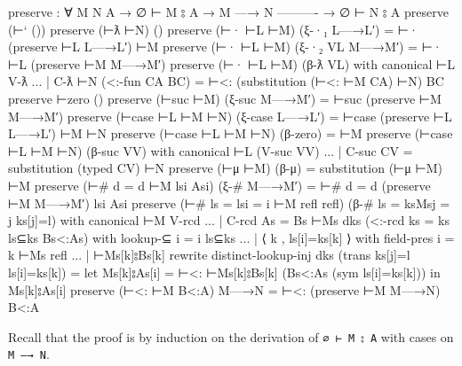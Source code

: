 \begin{fence}
\begin{code}
preserve : ∀ {M N A}
  → ∅ ⊢ M ⦂ A
  → M —→ N
    ----------
  → ∅ ⊢ N ⦂ A
preserve (⊢` ())
preserve (⊢ƛ ⊢N)                 ()
preserve (⊢· ⊢L ⊢M)              (ξ-·₁ L—→L′)     =  ⊢· (preserve ⊢L L—→L′) ⊢M
preserve (⊢· ⊢L ⊢M)              (ξ-·₂ VL M—→M′)  =  ⊢· ⊢L (preserve ⊢M M—→M′)
preserve (⊢· ⊢L ⊢M)              (β-ƛ VL)
    with canonical ⊢L V-ƛ
... | C-ƛ ⊢N (<:-fun CA BC)                       =  ⊢<: (substitution (⊢<: ⊢M CA) ⊢N) BC
preserve ⊢zero                   ()
preserve (⊢suc ⊢M)               (ξ-suc M—→M′)    =  ⊢suc (preserve ⊢M M—→M′)
preserve (⊢case ⊢L ⊢M ⊢N)        (ξ-case L—→L′)   =  ⊢case (preserve ⊢L L—→L′) ⊢M ⊢N
preserve (⊢case ⊢L ⊢M ⊢N)        (β-zero)         =  ⊢M
preserve (⊢case ⊢L ⊢M ⊢N)        (β-suc VV)
    with canonical ⊢L (V-suc VV)
... | C-suc CV                                    =  substitution (typed CV) ⊢N
preserve (⊢μ ⊢M)                 (β-μ)            =  substitution (⊢μ ⊢M) ⊢M
preserve (⊢# {d = d} ⊢M lsi Asi) (ξ-# M—→M′)      =  ⊢# {d = d} (preserve ⊢M M—→M′) lsi Asi
preserve (⊢# {ls = ls}{i = i} ⊢M refl refl) (β-# {ls = ks}{Ms}{j = j} ks[j]=l)
    with canonical ⊢M V-rcd
... | C-rcd {As = Bs} ⊢Ms dks (<:-rcd {ks = ks} ls⊆ks Bs<:As)
    with lookup-⊆ {i = i} ls⊆ks
... | ⟨ k , ls[i]=ks[k] ⟩
    with field-pres {i = k} ⊢Ms refl
... | ⊢Ms[k]⦂Bs[k]
    rewrite distinct-lookup-inj dks (trans ks[j]=l ls[i]=ks[k]) =
    let Ms[k]⦂As[i] = ⊢<: ⊢Ms[k]⦂Bs[k] (Bs<:As (sym ls[i]=ks[k])) in
    Ms[k]⦂As[i]
preserve (⊢<: ⊢M B<:A) M—→N                       =  ⊢<: (preserve ⊢M M—→N) B<:A
\end{code}
\end{fence}

Recall that the proof is by induction on the derivation of
\texttt{∅\ ⊢\ M\ ⦂\ A} with cases on \texttt{M\ —→\ N}.

